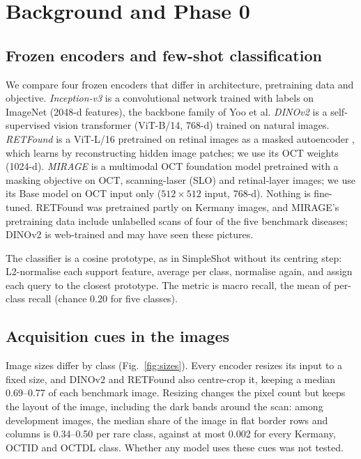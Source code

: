 \documentclass[conference]{IEEEtran}
\begin{document}
\section{Background and Phase 0}
\subsection{Frozen encoders and few-shot classification}
We compare four frozen encoders that differ in architecture, pretraining data and objective. \emph{Inception-v3} \cite{Szegedy2016} is a convolutional network trained with labels on ImageNet (2048-d features), the backbone family of Yoo et al. \emph{DINOv2} \cite{DINOv2} is a self-supervised vision transformer (ViT-B/14, 768-d) trained on natural images. \emph{RETFound} \cite{RETFound2023} is a ViT-L/16 pretrained on retinal images as a masked autoencoder \cite{He2022}, which learns by reconstructing hidden image patches; we use its OCT weights (1024-d). \emph{MIRAGE} \cite{MIRAGE2025} is a multimodal OCT foundation model pretrained with a masking objective on OCT, scanning-laser (SLO) and retinal-layer images; we use its Base model on OCT input only ($512\times512$ input, 768-d).
Nothing is fine-tuned. RETFound was pretrained partly on Kermany images, and MIRAGE's pretraining data include unlabelled scans of four of the five benchmark diseases; DINOv2 is web-trained and may have seen these pictures.

The classifier is a cosine prototype, as in SimpleShot \cite{SimpleShot2019} without its centring step: L2-normalise each support feature, average per class, normalise again, and assign each query to the closest prototype. The metric is macro recall, the mean of per-class recall (chance 0.20 for five classes).

\subsection{Acquisition cues in the images}
Image sizes differ by class (Fig.~\ref{fig:sizes}). Every encoder resizes its input to a fixed size, and DINOv2 and RETFound also centre-crop it, keeping a median 0.69--0.77 of each benchmark image. Resizing changes the pixel count but keeps the layout of the image, including the dark bands around the scan: among development images, the median share of the image in flat border rows and columns is 0.34--0.50 per rare class, against at most 0.002 for every Kermany, OCTID and OCTDL class. Whether any model uses these cues was not tested.
\end{document}
